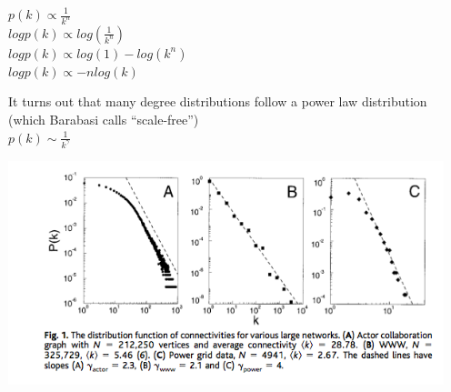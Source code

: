 \documentclass[aspectratio=169]{beamer}
\begin{document}
\begin{frame}

\setcounter{subfigure}{0}%
\begin{figure}
  \centering
\end{figure}

\pause

$p(k) \propto \frac{1}{k^n}$\\ \pause
$log p(k) \propto log(\frac{1}{k^n})$\\ \pause
$log p(k) \propto log(1) - log(k^n)$\\ \pause
$log p(k) \propto - n log(k)$\\ 


\end{frame}
\begin{frame}

It turns out that many degree distributions follow a power law distribution (which Barabasi calls ``scale-free'')\\
$p(k) \sim \frac{1}{k^{\gamma}}$

\begin{center}
\includegraphics[width = 0.95\textwidth]{figures/barabasi_emergence_1999_fig1}
\end{center}

\end{frame}
\end{document}
